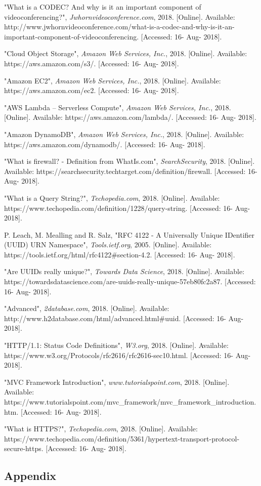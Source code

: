 \documentclass[letterpaper,12pt]{article}
\begin{document}
\begin{thebibliography}{99}
"What is a CODEC? And why is it an important component of videoconferencing?", \textit{Jwhornvideoconference.com}, 2018. [Online]. Available: http://www.jwhornvideoconference.com/what-is-a-codec-and-why-is-it-an-important-component-of-videoconferencing. [Accessed: 16- Aug- 2018].

"Cloud Object Storage", \textit{Amazon Web Services, Inc.}, 2018. [Online]. Available: https://aws.amazon.com/s3/. [Accessed: 16- Aug- 2018].

"Amazon EC2", \textit{Amazon Web Services, Inc.}, 2018. [Online]. Available: https://aws.amazon.com/ec2. [Accessed: 16- Aug- 2018].

"AWS Lambda – Serverless Compute", \textit{Amazon Web Services, Inc.}, 2018. [Online]. Available: https://aws.amazon.com/lambda/. [Accessed: 16- Aug- 2018].

"Amazon DynamoDB", \textit{Amazon Web Services, Inc.}, 2018. [Online]. Available: https://aws.amazon.com/dynamodb/. [Accessed: 16- Aug- 2018].

"What is firewall? - Definition from WhatIs.com", \textit{SearchSecurity}, 2018. [Online]. Available: https://searchsecurity.techtarget.com/definition/firewall. [Accessed: 16- Aug- 2018].

"What is a Query String?", \textit{Techopedia.com}, 2018. [Online]. Available: https://www.techopedia.com/definition/1228/query-string. [Accessed: 16- Aug- 2018].

P. Leach, M. Mealling and R. Salz, "RFC 4122 - A Universally Unique IDentifier (UUID) URN Namespace", \textit{Tools.ietf.org}, 2005. [Online]. Available: https://tools.ietf.org/html/rfc4122\#section-4.2. [Accessed: 16- Aug- 2018].

"Are UUIDs really unique?", \textit{Towards Data Science}, 2018. [Online]. Available: https://towardsdatascience.com/are-uuids-really-unique-57eb80fc2a87. [Accessed: 16- Aug- 2018].

"Advanced", \textit{2database.com}, 2018. [Online]. Available: http://www.h2database.com/html/advanced.html\#uuid. [Accessed: 16- Aug- 2018].

"HTTP/1.1: Status Code Definitions", \textit{W3.org}, 2018. [Online]. Available: https://www.w3.org/Protocols/rfc2616/rfc2616-sec10.html. [Accessed: 16- Aug- 2018].

"MVC Framework Introduction", \textit{www.tutorialspoint.com}, 2018. [Online]. Available: https://www.tutorialspoint.com/mvc\_framework/mvc\_framework\_introduction.htm. [Accessed: 16- Aug- 2018].

"What is HTTPS?", \textit{Techopedia.com}, 2018. [Online]. Available: https://www.techopedia.com/definition/5361/hypertext-transport-protocol-secure-https. [Accessed: 16- Aug- 2018].



\end{thebibliography}

\begin{appendices}
\section{Appendix}
\end{appendices}
\end{document}
